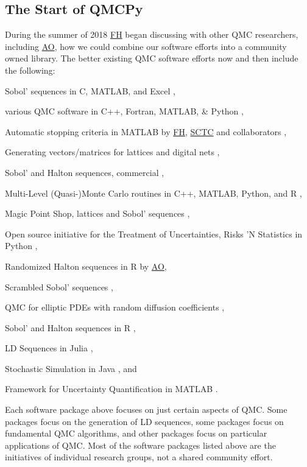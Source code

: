 \documentclass[11pt]{NSFamsart}
\newcommand{\FH}{\hyperlink{FHlink}{FH}\xspace}
\newcommand{\SCTC}{\hyperlink{SCTClink}{SCTC}\xspace}
\newcommand{\AO}{\hyperlink{AOlink}{AO}\xspace}
\begin{document}
\subsection{The Start of QMCPy}
During the summer of 2018 \FH began discussing with other QMC researchers, including \AO, how we could combine our software efforts into a community owned library.  The better existing QMC software efforts now and then include the following:
\begin{description}[format=\textup]
	\item[BRODA] Sobol' sequences in C, MATLAB, and Excel \cite{BRODA20a},
	\item[Burkhardt] various QMC software in C++, Fortran, MATLAB, \& Python \cite{Bur20a},
	\item[GAIL] Automatic stopping criteria in MATLAB by \FH, \SCTC and collaborators \cite{ChoEtal20a},
	\item[LatNet Builder] Generating vectors/matrices for lattices and digital nets \cite{LatNet},
	\item[MATLAB] Sobol' and Halton sequences, commercial \cite{MAT9.8},
	\item[ML(Q)MC] Multi-Level (Quasi-)Monte Carlo routines in C++, MATLAB, Python, and R \cite{GilesSoft},
	\item[MPS] Magic Point Shop, lattices and Sobol' sequences \cite{Nuy17a},
	\item[OpenTURNS] Open source initiative for the Treatment of Uncertainties, Risks 'N Statistics in Python \cite{OpenTURNS},
	\item[Owen] Randomized Halton sequences in R by \AO \cite{Owe20a},
	\item[PyTorch] Scrambled Sobol' sequences \cite{PyTorch},
	\item[QMC4PDE] QMC for elliptic PDEs with random diffusion coefficients \cite{KuoNuy16a},
	\item [qrng]  Sobol' and Halton sequences in R \cite{QRNG2020},
	\item[Robbe] LD Sequences in Julia \cite{Rob20a},
	\item[SSJ] Stochastic Simulation in Java \cite{SSJ}, and
	\item[UQLab] Framework for Uncertainty Quantification in MATLAB \cite{UQLab2014}.
\end{description}
Each software package above  focuses on just certain aspects of QMC.  Some packages focus on the generation of LD sequences, some packages focus on fundamental QMC algorithms, and other packages focus on particular applications of QMC.  Most of the software packages listed above are the initiatives of individual research groups, not a shared community effort.
\end{document}
